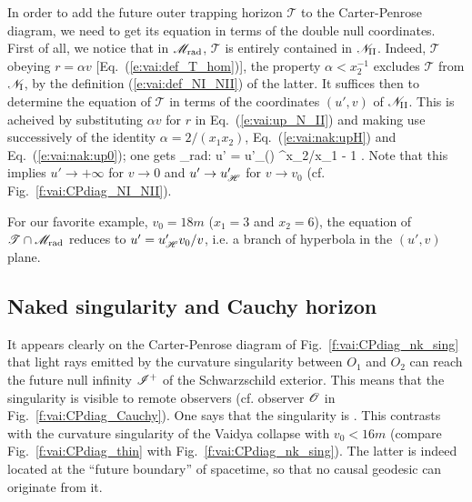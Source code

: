 In order to add the future outer trapping horizon $\mathscr{T}$
to the Carter-Penrose diagram, we need to get its equation in terms of the
double null coordinates. First of all, we notice that in $\mathscr{M}_{\rm rad}$, $\mathscr{T}$ is
entirely contained in $\mathscr{N}_{\rm II}$. Indeed, $\mathscr{T}$ obeying
$r = \alpha v$ [Eq.~(\ref{e:vai:def_T_hom})], the property $\alpha < x_2^{-1}$
excludes $\mathscr{T}$ from $\mathscr{N}_{\rm I}$, by the definition
(\ref{e:vai:def_NI_NII}) of the latter. It suffices then to determine
the equation of $\mathscr{T}$ in terms of the coordinates $(u',v)$ of  $\mathscr{N}_{\rm II}$.
This is acheived by substituting $\alpha v$ for $r$ in Eq.~(\ref{e:vai:up_N_II}) and making use successively of
the identity $\alpha = 2/(x_1 x_2)$,
Eq.~(\ref{e:vai:nak:upH}) and Eq.~(\ref{e:vai:nak:up0}); one gets
\be \label{e:vai:eq_T_NII}
     \cap \M_{\rm rad}:\qquad
    u' = u'_\Hor \left(\right) ^{x_2/x_1 - 1} .
\ee
Note that this implies $u'\to +\infty$ for $v\to 0$ and
$u'\to u'_{\mathscr{H}}$ for $v\to v_0$ (cf. Fig.~\ref{f:vai:CPdiag_NI_NII}).
\begin{example}
For our favorite example, $v_0 = 18m$ ($x_1 = 3$ and $x_2 = 6$),
the equation of $\mathscr{T} \cap \mathscr{M}_{\rm rad}$ reduces
to $u' = u'_{\mathscr{H}} v_0/v$, i.e. a branch of hyperbola in the $(u',v)$ plane.
\end{example}


\subsection{Naked singularity and Cauchy horizon} \label{s:vai:nak_Cauchy}

It appears clearly on the Carter-Penrose diagram of Fig.~\ref{f:vai:CPdiag_nk_sing}
that light rays emitted by the curvature singularity
between $O_1$ and $O_2$ can reach the future null infinity $\mathscr{I}^+$ of the
Schwarzschild exterior. This means that the singularity is visible to
remote observers (cf. observer $\mathscr{O}$ in Fig.~\ref{f:vai:CPdiag_Cauchy}).
One says that the singularity
is .
This contrasts with the curvature singularity of the
Vaidya collapse with $v_0 < 16 m$ (compare Fig.~\ref{f:vai:CPdiag_thin}
with Fig.~\ref{f:vai:CPdiag_nk_sing}).
The latter is indeed located at the ``future boundary'' of spacetime, so that
no causal geodesic can originate from it.

